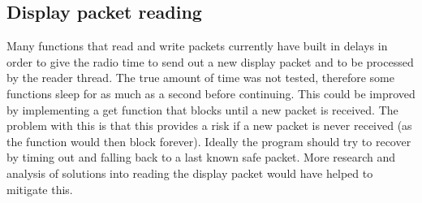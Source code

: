 \subsection*{Display packet reading}
\label{display_packet_reading}
Many functions that read and write packets currently have built in delays in order to give the radio time to send out a new display packet and to be processed by the reader thread. The true amount of time was not tested, therefore some functions sleep for as much as a second before continuing. This could be improved by implementing a get function that blocks until a new packet is received. The problem with this is that this provides a risk if a new packet is never received (as the function would then block forever). Ideally the program should try to recover by timing out and falling back to a last known safe packet. More research and analysis of solutions into reading the display packet would have helped to mitigate this.

